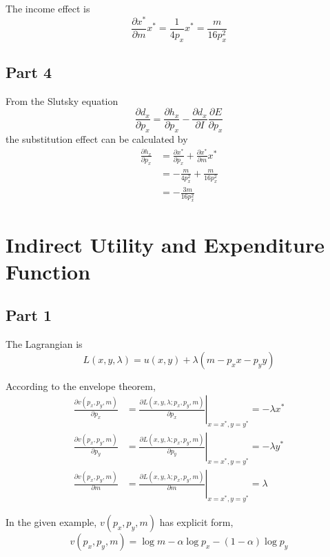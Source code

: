 \documentclass{article}
\begin{document}
The income effect is
\begin{equation*}
	\frac{\partial x^*}{\partial m}x^*=\frac{1}{4p_x}x^*=\frac{m}{16p_x^2}
\end{equation*}

\subsection{Part 4}
From the Slutsky equation
\begin{equation*}
	\frac{\partial d_x}{\partial p_x}=\frac{\partial h_x}{\partial p_x}-\frac{\partial d_x}{\partial I}\frac{\partial E}{\partial p_x}
\end{equation*}
the substitution effect can be calculated by
\begin{align*}
	\frac{\partial h_x}{\partial p_x}&=\frac{\partial x^*}{\partial p_x}+\frac{\partial x^*}{\partial m}x^*\\
	&=-\frac{m}{4p_x^2}+\frac{m}{16p_x^2}\\
	&=-\frac{3m}{16p_x^2}
\end{align*}

\section{Indirect Utility and Expenditure Function}
\subsection{Part 1}
The Lagrangian is
\begin{equation*}
	L(x,y,\lambda)=u(x,y)+\lambda(m-p_xx-p_yy)
\end{equation*}

According to the envelope theorem,
\begin{align*}
	\frac{\partial v(p_x,p_y,m)}{\partial p_x}&=\left.\frac{\partial L(x,y,\lambda;p_x,p_y,m)}{\partial p_x}\right|_{x=x^*,y=y^*}=-\lambda x^*\\
	\frac{\partial v(p_x,p_y,m)}{\partial p_y}&=\left.\frac{\partial L(x,y,\lambda;p_x,p_y,m)}{\partial p_y}\right|_{x=x^*,y=y^*}=-\lambda y^*\\
	\frac{\partial v(p_x,p_y,m)}{\partial m}&=\left.\frac{\partial L(x,y,\lambda;p_x,p_y,m)}{\partial m}\right|_{x=x^*,y=y^*}=\lambda
\end{align*}

In the given example, $v(p_x,p_y,m)$ has explicit form,
\begin{equation*}
	v(p_x,p_y,m)=\log m-\alpha\log p_x-(1-\alpha)\log p_y
\end{equation*}
\end{document}
